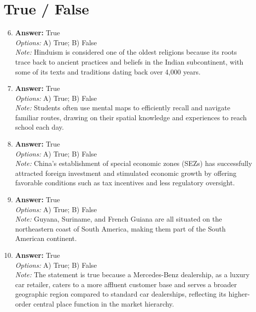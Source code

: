 \documentclass[12pt]{article}
\begin{document}
\section*{True / False}
\begin{enumerate}[label=\arabic*.]
\setcounter{enumi}{5}
\item \textbf{Answer:} True
\\ \textit{Options:} A) True; B) False
\\ \textit{Note:} Hinduism is considered one of the oldest religions because its roots trace back to ancient practices and beliefs in the Indian subcontinent, with some of its texts and traditions dating back over 4,000 years.
\item \textbf{Answer:} True
\\ \textit{Options:} A) True; B) False
\\ \textit{Note:} Students often use mental maps to efficiently recall and navigate familiar routes, drawing on their spatial knowledge and experiences to reach school each day.
\item \textbf{Answer:} True
\\ \textit{Options:} A) True; B) False
\\ \textit{Note:} China's establishment of special economic zones (SEZs) has successfully attracted foreign investment and stimulated economic growth by offering favorable conditions such as tax incentives and less regulatory oversight.
\item \textbf{Answer:} True
\\ \textit{Options:} A) True; B) False
\\ \textit{Note:} Guyana, Suriname, and French Guiana are all situated on the northeastern coast of South America, making them part of the South American continent.
\item \textbf{Answer:} True
\\ \textit{Options:} A) True; B) False
\\ \textit{Note:} The statement is true because a Mercedes-Benz dealership, as a luxury car retailer, caters to a more affluent customer base and serves a broader geographic region compared to standard car dealerships, reflecting its higher-order central place function in the market hierarchy.
\end{enumerate}
\end{document}
